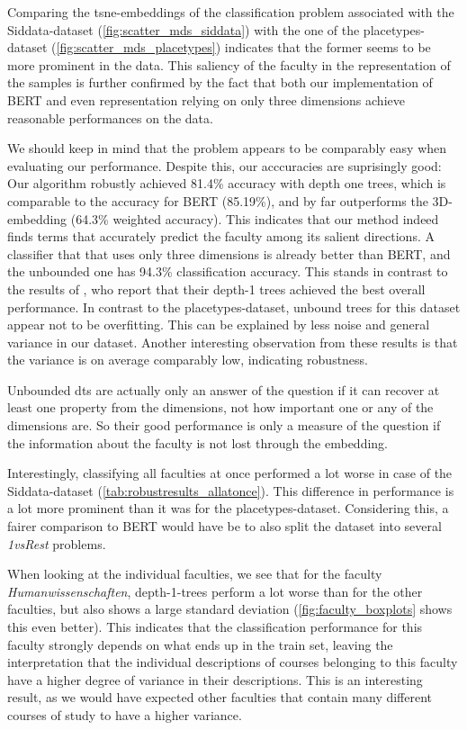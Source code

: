 Comparing the \gls{tsne}-embeddings of the classification problem associated with the Siddata-dataset (\autoref{fig:scatter_mds_siddata}) with the one of the placetypes-dataset (\autoref{fig:scatter_mds_placetypes}) indicates that the former seems to be more prominent in the data. This saliency of the faculty in the representation of the samples is further confirmed by the fact that both our implementation of BERT and even representation relying on only three dimensions achieve reasonable performances on the data.

We should keep in mind that the problem appears to be comparably easy when evaluating our performance. Despite this, our acccuracies are suprisingly good: Our algorithm robustly achieved  81.4\% accuracy with depth one trees, which is comparable to the accuracy for BERT (85.19\%), and by far outperforms the 3D-embedding (64.3\% weighted accuracy). This indicates that our method indeed finds terms that accurately predict the faculty among its salient directions. A classifier that that uses only three dimensions is already better than BERT, and the unbounded one has 94.3\% classification accuracy. This stands in contrast to the results of \cite{Ager2018}, who report that their depth-1 trees achieved the best overall performance. In contrast to the placetypes-dataset, unbound trees for this dataset appear not to be overfitting. This can be explained by less noise and general variance in our dataset. Another interesting observation from these results is that the variance is on average comparably low, indicating robustness. 

Unbounded \glspl{dt} are actually only an answer of the question if it can recover at least one property from the dimensions, not how important one or any of the dimensions are. So their good performance is only a measure of the question if the information about the faculty is not lost through the embedding.

Interestingly, classifying all faculties at once performed a lot worse in case of the Siddata-dataset (\autoref{tab:robustresults_allatonce}). This difference in performance is a lot more prominent than it was for the placetypes-dataset. %
Considering this, a fairer comparison to BERT would have be to also split the dataset into several \textit{1vsRest} problems.


When looking at the individual faculties, we see that for the faculty \textit{Humanwissenschaften}, depth-1-trees perform a lot worse than for the other faculties, but also shows a large standard deviation (\autoref{fig:faculty_boxplots} shows this even better). This indicates that the classification performance for this faculty strongly depends on what ends up in the train set, leaving the interpretation that the individual descriptions of courses belonging to this faculty have a higher degree of variance in their descriptions. This is an interesting result, as we would have expected other faculties that contain many different courses of study to have a higher variance. %

